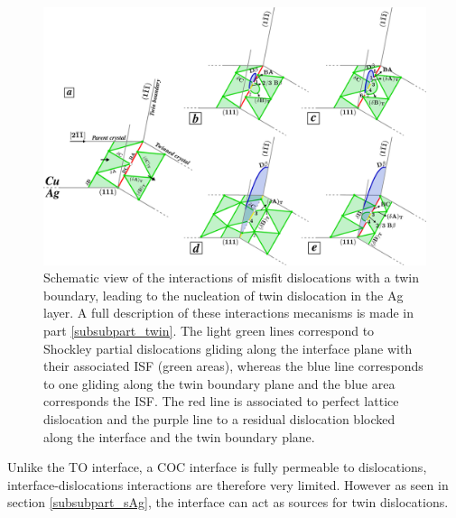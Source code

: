 \documentclass[final,3p,times,twocolumn]{elsarticle}
\begin{document}
\begin{figure}[!b]
	\begin{center}
		\includegraphics[width=150mm]{Pic/fig_ENT.eps} 
	\end{center}\caption{Schematic view of the interactions of misfit dislocations with a twin boundary, leading to the nucleation of twin dislocation in the Ag layer. A full description of these interactions mecanisms is made in part \ref{subsubpart_twin}. The light green lines correspond to Shockley partial dislocations gliding along the interface plane with their associated ISF (green areas), whereas the blue line corresponds to one gliding along the twin boundary plane and the blue area corresponds the ISF. The red line is associated to perfect lattice dislocation and the purple line to a residual dislocation blocked along the interface and the twin boundary plane.}\label{fig_ENT}
\end{figure}

Unlike the TO interface, a COC interface is fully permeable to dislocations, interface-dislocations interactions are therefore very limited. However as seen in section \ref{subsubpart_sAg}, the interface can act as sources for twin dislocations.

\end{document}
